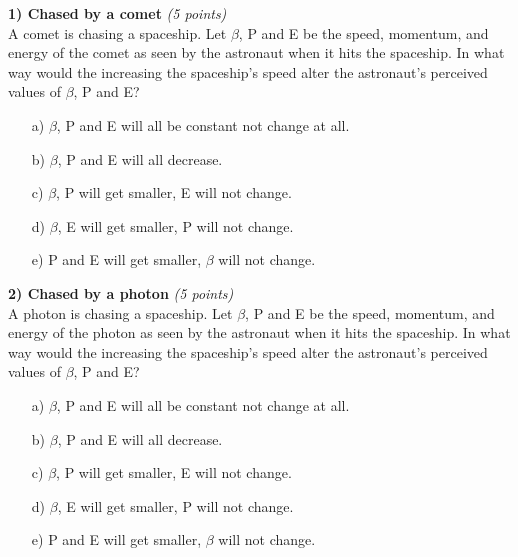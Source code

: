 {\large



\textbf{1) Chased by a comet }\hfill \textit{(5 points)}\\
A comet is chasing a spaceship.
Let $\beta$, P and E be the speed, momentum, and energy of the comet as seen by the astronaut when it hits the spaceship. 
In what way would the increasing the spaceship's speed alter the astronaut's perceived values of $\beta$, P and E?

\begin{itemize}
\item[a)] $\beta$, P and E will all be constant not change at all.
\item[b)] $\beta$, P and E will all decrease.
\item[c)] $\beta$, P will get smaller, E will not change.
\item[d)] $\beta$, E will get smaller, P will not change.
\item[e)] P and E will get smaller, $\beta$ will not change.
\end{itemize}

\vspace{0.5in}

\textbf{2) Chased by a photon }\hfill \textit{(5 points)}\\
A photon is chasing a spaceship.
Let $\beta$, P and E be the speed, momentum, and energy of the photon as seen by the astronaut when it hits the spaceship. 
In what way would the increasing the spaceship's speed alter the astronaut's perceived values of $\beta$, P and E?

\begin{itemize}
\item[a)] $\beta$, P and E will all be constant not change at all.
\item[b)] $\beta$, P and E will all decrease.
\item[c)] $\beta$, P will get smaller, E will not change.
\item[d)] $\beta$, E will get smaller, P will not change.
\item[e)] P and E will get smaller, $\beta$ will not change.
\end{itemize}

\vspace{0.5in}


}
